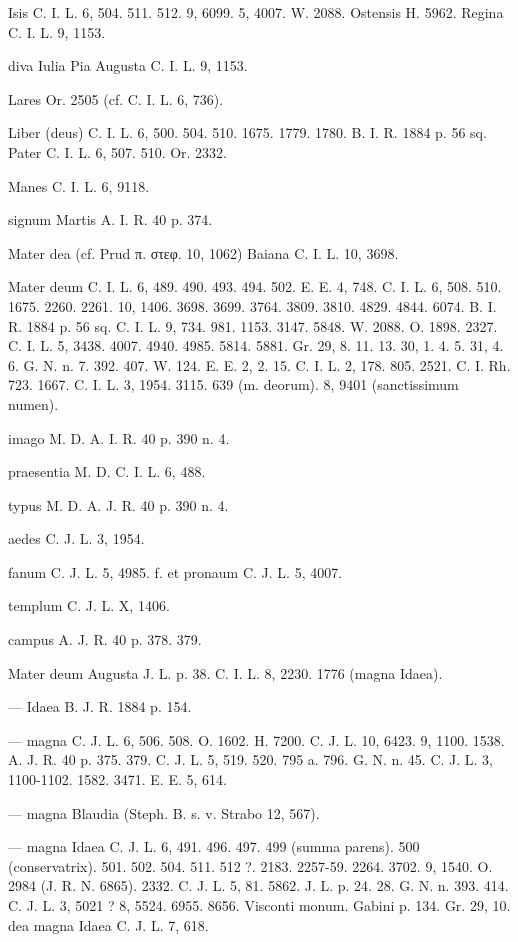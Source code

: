\documentclass[a4paper, 11pt, oneside, polutonikogreek, german]{article}
\begin{document}
Isis C. I. L. 6, 504. 511. 512. 9, 6099. 5, 4007. W. 2088. Ostensis H. 5962. Regina C. I. L. 9, 1153.

diva Iulia Pia Augusta C. I. L. 9, 1153.

Lares Or. 2505 (cf. C. I. L. 6, 736).

Liber (deus) C. I. L. 6, 500. 504. 510. 1675. 1779. 1780. B. I. R. 1884 p. 56 sq. Pater C. I. L. 6, 507. 510. Or. 2332.

Manes C. I. L. 6, 9118.

signum Martis A. I. R. 40 p. 374.

Mater dea (cf. Prud π. στεφ. 10, 1062) Baiana C. I. L. 10, 3698.

Mater deum C. I. L. 6, 489. 490. 493. 494. 502. E. E. 4, 748. C. I. L. 6, 508. 510. 1675. 2260. 2261. 10, 1406. 3698. 3699. 3764. 3809. 3810. 4829. 4844. 6074. B. I. R. 1884 p. 56 sq. C. I. L. 9, 734. 981. 1153. 3147. 5848. W. 2088. O. 1898. 2327. C. I. L. 5, 3438. 4007. 4940. 4985. 5814. 5881. Gr. 29, 8. 11. 13. 30, 1. 4. 5. 31, 4. 6. G. N. n. 7. 392. 407. W. 124. E. E. 2, 2. 15. C. I. L. 2, 178. 805. 2521. C. I. Rh. 723. 1667. C. I. L. 3, 1954. 3115. 639 (m. deorum). 8, 9401 (sanctissimum numen).

imago M. D. A. I. R. 40 p. 390 n. 4.

praesentia M. D. C. I. L. 6, 488.

typus M. D. A. J. R. 40 p. 390 n. 4.

aedes C. J. L. 3, 1954.

fanum C. J. L. 5, 4985. f. et pronaum C. J. L. 5, 4007.

templum C. J. L. X, 1406.

campus A. J. R. 40 p. 378. 379.

Mater deum Augusta J. L. p. 38. C. I. L. 8, 2230. 1776 (magna Idaea).

--- Idaea B. J. R. 1884 p. 154.

--- magna C. J. L. 6, 506. 508. O. 1602. H. 7200. C. J. L. 10, 6423. 9, 1100. 1538. A. J. R. 40 p. 375. 379. C. J. L. 5, 519. 520. 795 a. 796. G. N. n. 45. C. J. L. 3, 1100-1102. 1582. 3471. E. E. 5, 614.

--- magna Blaudia (Steph. B. s. v. Strabo 12, 567).

--- magna Idaea C. J. L. 6, 491. 496. 497. 499 (summa parens). 500 (conservatrix). 501. 502. 504. 511. 512 ?. 2183. 2257-59. 2264. 3702. 9, 1540. O. 2984 (J. R. N. 6865). 2332. C. J. L. 5, 81. 5862. J. L. p. 24. 28. G. N. n. 393. 414. C. J. L. 3, 5021 ? 8, 5524. 6955. 8656. Visconti monum. Gabini p. 134. Gr. 29, 10. dea magna Idaea C. J. L. 7, 618.
\end{document}
